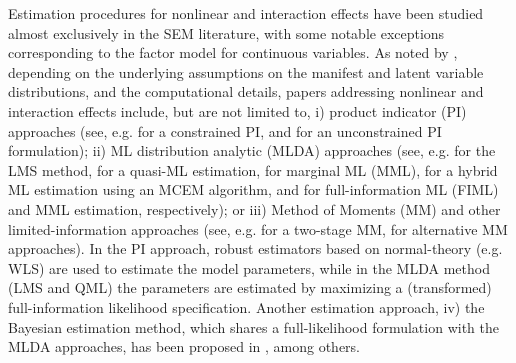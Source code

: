 \documentclass[11pt, a4paper]{article}
\begin{document}
Estimation procedures for nonlinear and interaction effects have been studied almost exclusively in the SEM literature, with some notable exceptions corresponding to the factor model for continuous variables. As noted by \citet{HarringEtAl_PsyMeth2012, BrandtEtAl_SEM2014}, depending on the underlying assumptions on the manifest and latent variable distributions, and the computational details, papers addressing nonlinear and interaction effects include, but are not limited to, i) product indicator (PI) approaches (see, e.g. \citealp{Kenny&Judd_PsychBull1984, Joreskog&Yang_1996} for a constrained PI, and \citealp{MarshEtAl_PsyMeth2004, Kelava&Brandt_RevPsy2009} for an unconstrained PI formulation); ii) ML distribution analytic (MLDA) approaches (see, e.g. \citet{Klein&Moosbrugger_Psychometrika2000} for the LMS method, \citet{Klein&Muthen_MultBehRes2007} for a quasi-ML estimation, \citet{CudeckEtAl_JEBS2009} for marginal ML (MML), \citet{Lee&Zhu_Psychometrika2002, LeeEtAl_JEBS2003, LeeEtAl_BJMSP2009} for a hybrid ML estimation using an MCEM algorithm, and \citet{Rizopoulos&Moustaki_BJMSP2008, JinEtAl_SEM2020} for full-information ML (FIML) and MML estimation, respectively); or iii) Method of Moments (MM) and other limited-information approaches (see, e.g. \citet{Wall&Amemiya_JASA2000, Wall&Amemiya_JofEdBehSta2001, Wall&Amemiya_BJMSP2003, Yalcin&Amemiya_StatSci2001} for a two-stage MM, \citet{Bollen_SocMeth1995, Bollen_Psychometrika1996, Mooijart&Bentler_SEM2010, Finch_SEM2015} for alternative MM approaches). In the PI approach, robust estimators based on normal-theory (e.g. WLS) are used to estimate the model parameters, while in the MLDA method (LMS and QML) the parameters are estimated by maximizing a (transformed) full-information likelihood specification. Another estimation approach, iv) the Bayesian estimation method, which shares a full-likelihood formulation with the MLDA approaches, has been proposed in \citet{Arminger&Muthen_Psychometrika1998, Zhu&Lee_BJMSP1999, Song&Lee_MultBehRes2006, Fahrmeir&Raach_Psychometrika2007, LeeEtAl_SEM2007, Song&Lee_StatMed2007, Song&Lu_JofCGStats2010, Kelava&Nagengast_MultBehRes2012, SongEtAl_Psychometrika2013}, among others.
\end{document}

